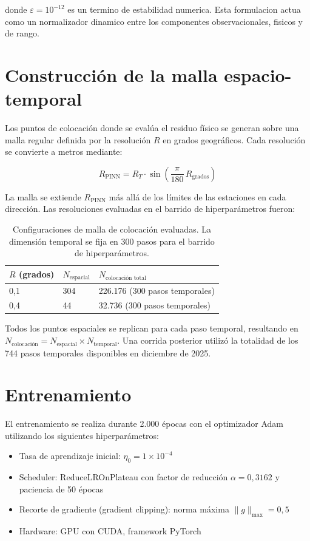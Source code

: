 donde $\varepsilon = 10^{-12}$ es un termino de estabilidad numerica. Esta formulacion actua como un normalizador dinamico entre los componentes observacionales, fisicos y de rango.

\section{Construcción de la malla espacio-temporal}

Los puntos de colocación donde se evalúa el residuo físico se generan sobre una malla regular definida por la resolución $R$ en grados geográficos. Cada resolución se convierte a metros mediante:

\[
R_{\text{PINN}} = R_T \cdot \sin\left(\frac{\pi}{180}\,R_{\text{grados}}\right)
\]

La malla se extiende $R_{\text{PINN}}$ más allá de los límites de las estaciones en cada dirección. Las resoluciones evaluadas en el barrido de hiperparámetros fueron:

\begin{table}[H]
\centering
\begin{tabular}{lll}
\hline
$R$ (grados) & $N_{\text{espacial}}$ & $N_{\text{colocación total}}$ \\
\hline
0,1 & 304 & 226.176 (300 pasos temporales) \\
0,4 & 44 & 32.736 (300 pasos temporales) \\
\hline
\end{tabular}
\caption{Configuraciones de malla de colocación evaluadas. La dimensión temporal se fija en 300 pasos para el barrido de hiperparámetros.}
\label{tab:malla_coloc}
\end{table}

Todos los puntos espaciales se replican para cada paso temporal, resultando en $N_{\text{colocación}} = N_{\text{espacial}} \times N_{\text{temporal}}$. Una corrida posterior utilizó la totalidad de los 744 pasos temporales disponibles en diciembre de 2025.

\section{Entrenamiento}

El entrenamiento se realiza durante 2.000 épocas con el optimizador Adam utilizando los siguientes hiperparámetros:

\begin{itemize}
	\item Tasa de aprendizaje inicial: $\eta_0 = 1 \times 10^{-4}$
	\item Scheduler: ReduceLROnPlateau con factor de reducción $\alpha = 0{,}3162$ y paciencia de 50 épocas
	\item Recorte de gradiente (gradient clipping): norma máxima $\|g\|_{\max} = 0{,}5$
	\item Hardware: GPU con CUDA, framework PyTorch
\end{itemize}

